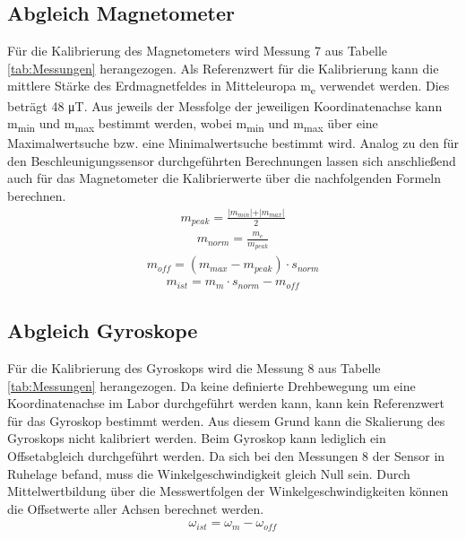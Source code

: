 \subsection{Abgleich Magnetometer}
Für die Kalibrierung des Magnetometers wird Messung 7 aus Tabelle \ref{tab:Messungen} herangezogen. Als Referenzwert für die Kalibrierung kann die mittlere Stärke des Erdmagnetfeldes in Mitteleuropa m\textsubscript{e} verwendet werden. Dies beträgt 48 μT. Aus jeweils der Messfolge der jeweiligen Koordinatenachse kann m\textsubscript{min} und m\textsubscript{max} bestimmt werden, wobei m\textsubscript{min} und m\textsubscript{max} über eine Maximalwertsuche bzw. eine Minimalwertsuche bestimmt wird. Analog zu den für den Beschleunigungssensor durchgeführten Berechnungen lassen sich anschließend auch für das Magnetometer die Kalibrierwerte über die nachfolgenden Formeln berechnen.
\begin{align}
	m_{peak}=\frac{\vert{m_{min}}\vert+\vert{m_{max}}\vert}{2}
	\label{eq: m_peak}
\end{align}
\begin{align}
	m_{norm}=\frac{m_e}{m_{peak}}
	\label{eq: m_norm}
\end{align}
\begin{align}
	m_{off}=(m_{max}-m_{peak})\cdot{s_{norm}}
	\label{eq: m_off}
\end{align}
\begin{align}
	m_{ist}=m_m\cdot{s_{norm}}-m_{off}
	\label{eq: m_ist}
\end{align}

\subsection{Abgleich Gyroskope}
Für die Kalibrierung des Gyroskops wird die Messung 8 aus Tabelle \ref{tab:Messungen} herangezogen. Da keine definierte Drehbewegung um eine Koordinatenachse im Labor durchgeführt werden kann, kann kein Referenzwert für das Gyroskop bestimmt werden. Aus diesem Grund kann die Skalierung des Gyroskops nicht kalibriert werden. Beim Gyroskop kann lediglich ein Offsetabgleich durchgeführt werden. Da sich bei den Messungen 8 der Sensor in Ruhelage befand, muss die Winkelgeschwindigkeit gleich Null sein. Durch Mittelwertbildung über die Messwertfolgen der Winkelgeschwindigkeiten können die Offsetwerte aller Achsen berechnet werden.
\begin{align}
	\omega_{ist}=\omega_m-\omega_{off}
	\label{eq: omega_ist}
\end{align}

